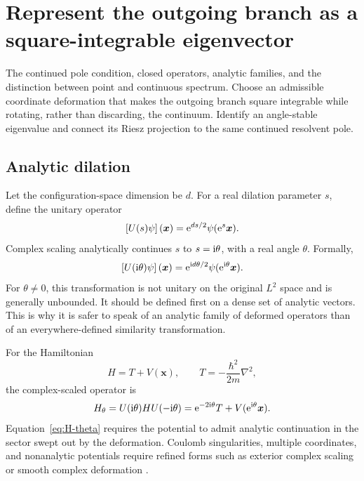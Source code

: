 \section{Represent the outgoing branch as a square-integrable eigenvector}
\label{sec:complex-scaling}

\calculationroute
  {The continued pole condition, closed operators, analytic families, and
  the distinction between point and continuous spectrum.}
  {Choose an admissible coordinate deformation that makes the outgoing branch
  square integrable while rotating, rather than discarding, the continuum.}
  {Identify an angle-stable eigenvalue and connect its Riesz projection to the
  same continued resolvent pole.}

\subsection{Analytic dilation}
\label{subsec:analytic-dilation}

Let the configuration-space dimension be $d$.  For a real dilation parameter
$s$, define the unitary operator
\begin{equation}
  \left[U(s)\psi\right](\bm x)
  =\mathrm{e}^{ds/2}\psi(\mathrm{e}^s\bm x) .
  \label{eq:real-dilation}
\end{equation}
Complex scaling analytically continues $s$ to $s=\mathrm{i}\theta$, with a real
angle $\theta$.  Formally,
\begin{equation}
  \left[U(\mathrm{i}\theta)\psi\right](\bm x)
  =\mathrm{e}^{\mathrm{i} d\theta/2}
  \psi(\mathrm{e}^{\mathrm{i}\theta}\bm x) .
  \label{eq:complex-dilation}
\end{equation}
For $\theta\ne0$, this transformation is not unitary on the original
$L^2$ space and is generally unbounded.  It should be defined first on a dense
set of analytic vectors.  This is why it is safer to speak of an analytic
family of deformed operators than of an everywhere-defined similarity
transformation.

For the Hamiltonian
\begin{equation}
  H=T+V(\bm x),
  \qquad
  T=-\frac{\hbar^2}{2m}\nabla^2,
  \label{eq:H-TV}
\end{equation}
the complex-scaled operator is
\begin{equation}
  H_{\theta}
  =U(\mathrm{i}\theta)HU(-\mathrm{i}\theta)
  =\mathrm{e}^{-2\mathrm{i}\theta}T
  +V(\mathrm{e}^{\mathrm{i}\theta}\bm x) .
  \label{eq:H-theta}
\end{equation}
Equation~\eqref{eq:H-theta} requires the potential to admit analytic
continuation in the sector swept out by the deformation.  Coulomb singularities,
multiple coordinates, and nonanalytic potentials require refined forms such
as exterior complex scaling or smooth complex deformation
\cite{Simon1979ECS,Reinhardt:1982,Moiseyev:2011}.

